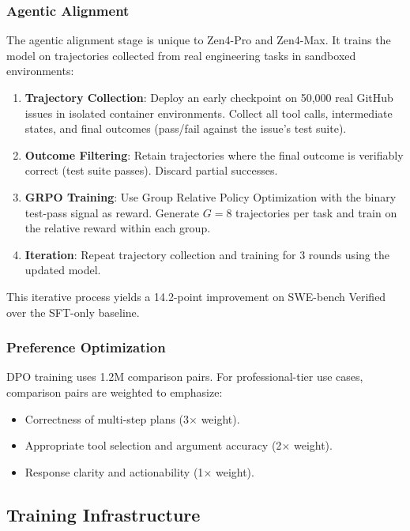 \documentclass[11pt,a4paper]{article}
\begin{document}
\subsubsection{Agentic Alignment}

The agentic alignment stage is unique to Zen4-Pro and Zen4-Max. It trains the model on
trajectories collected from real engineering tasks in sandboxed environments:

\begin{enumerate}
    \item \textbf{Trajectory Collection}: Deploy an early checkpoint on 50,000 real GitHub
    issues in isolated container environments. Collect all tool calls, intermediate states,
    and final outcomes (pass/fail against the issue's test suite).
    \item \textbf{Outcome Filtering}: Retain trajectories where the final outcome is
    verifiably correct (test suite passes). Discard partial successes.
    \item \textbf{GRPO Training}: Use Group Relative Policy Optimization with the binary
    test-pass signal as reward. Generate $G = 8$ trajectories per task and train on the
    relative reward within each group.
    \item \textbf{Iteration}: Repeat trajectory collection and training for 3 rounds
    using the updated model.
\end{enumerate}

This iterative process yields a 14.2-point improvement on SWE-bench Verified over the
SFT-only baseline.

\subsubsection{Preference Optimization}

DPO training uses 1.2M comparison pairs. For professional-tier use cases, comparison pairs
are weighted to emphasize:
\begin{itemize}
    \item Correctness of multi-step plans (3$\times$ weight).
    \item Appropriate tool selection and argument accuracy (2$\times$ weight).
    \item Response clarity and actionability (1$\times$ weight).
\end{itemize}

\subsection{Training Infrastructure}
\end{document}
